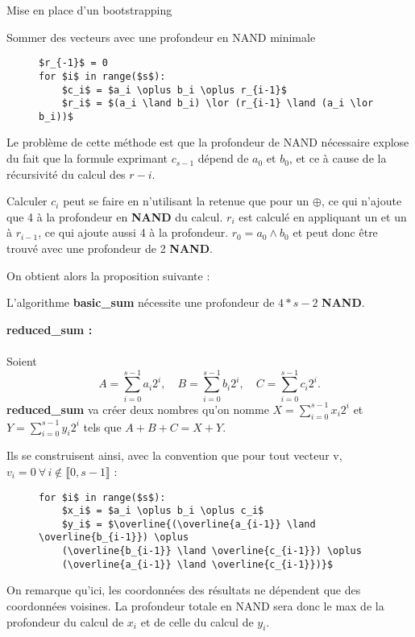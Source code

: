 \begin{section}{Mise en place d'un bootstrapping}
\begin{subsection}{Sommer des vecteurs avec une profondeur en NAND minimale}
\begin{figure}[!h]
\begin{lstlisting}
$r_{-1}$ = 0
for $i$ in range($s$):
	$c_i$ = $a_i \oplus b_i \oplus r_{i-1}$
	$r_i$ = $(a_i \land b_i) \lor (r_{i-1} \land (a_i \lor b_i))$
\end{lstlisting}
\end{figure}

	Le problème de cette méthode est que la profondeur de NAND nécessaire explose du fait que la formule exprimant $c_{s-1}$ dépend de $a_0$ et $b_0$, et ce à cause de la récursivité du calcul des $r-i$.

	Calculer $c_i$ peut se faire en n'utilisant la retenue que pour un $\oplus$, ce qui n'ajoute que 4 à la profondeur en \textbf{NAND} du calcul. $r_i$ est calculé en appliquant un  et un  à $r_{i-1}$, ce qui ajoute aussi 4 à la profondeur. $r_0 = a_0 \land b_0$ et peut donc être trouvé avec une profondeur de 2 \textbf{NAND}.
	
	On obtient alors la proposition suivante :
\begin{prop}
	L'algorithme \textbf{basic\_sum} nécessite une profondeur de $4*s - 2$ \textbf{NAND}.
\end{prop}


\vspace{0.3cm}
\noindent
\textbf{reduced\_sum :}
\paragraph{}

	Soient 
\[A = \sum_{i=0}^{s-1} a_i 2^i, \quad B = \sum_{i=0}^{s-1} b_i 2^i, \quad C = \sum_{i=0}^{s-1} c_i 2^i. \]
\textbf{reduced\_sum} va créer deux nombres qu'on nomme $X = \sum_{i=0}^{s-1} x_i 2^i$  et $Y = \sum_{i=0}^{s-1} y_i 2^i$ tels que $A + B + C = X + Y$.

	Ils se construisent ainsi, avec la convention que pour tout vecteur v, $v_i = 0 \  \forall \, i \not\in \llbracket 0, s-1 \rrbracket$ :
\begin{figure}[!h]
\begin{lstlisting}
for $i$ in range($s$):
	$x_i$ = $a_i \oplus b_i \oplus c_i$
	$y_i$ = $\overline{(\overline{a_{i-1}} \land \overline{b_{i-1}}) \oplus
	(\overline{b_{i-1}} \land \overline{c_{i-1}}) \oplus
	(\overline{a_{i-1}} \land \overline{c_{i-1}})}$
\end{lstlisting}
\end{figure}

	On remarque qu'ici, les coordonnées des résultats ne dépendent que des coordonnées voisines. La profondeur totale en NAND sera donc le max de la profondeur du calcul de $x_i$ et de celle du calcul de $y_i$.
	

\end{subsection}
\end{section}
